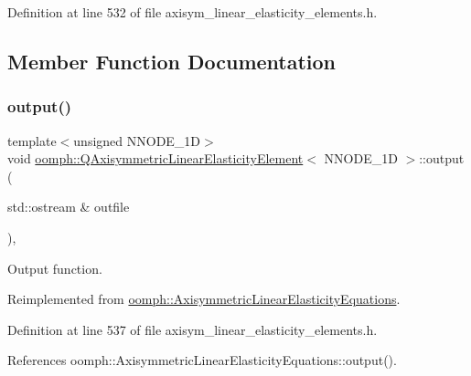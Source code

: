 Definition at line 532 of file axisym\+\_\+linear\+\_\+elasticity\+\_\+elements.\+h.



\subsection{Member Function Documentation}
\mbox{\label{classoomph_1_1QAxisymmetricLinearElasticityElement_adfd535d5ee563df242c0ff5febca99e2}} 
\subsubsection{\texorpdfstring{output()}{output()}\hspace{0.1cm}{\footnotesize\ttfamily [1/4]}}
{\footnotesize\ttfamily template$<$unsigned N\+N\+O\+D\+E\+\_\+1D$>$ \\
void \hyperlink{classoomph_1_1QAxisymmetricLinearElasticityElement}{oomph\+::\+Q\+Axisymmetric\+Linear\+Elasticity\+Element}$<$ N\+N\+O\+D\+E\+\_\+1D $>$\+::output (\begin{DoxyParamCaption}\item[{std\+::ostream \&}]{outfile }\end{DoxyParamCaption})\hspace{0.3cm}{\ttfamily [inline]}, {\ttfamily [virtual]}}



Output function. 



Reimplemented from \hyperlink{classoomph_1_1AxisymmetricLinearElasticityEquations_a798627057a8d79bccc17d277e1717f67}{oomph\+::\+Axisymmetric\+Linear\+Elasticity\+Equations}.



Definition at line 537 of file axisym\+\_\+linear\+\_\+elasticity\+\_\+elements.\+h.



References oomph\+::\+Axisymmetric\+Linear\+Elasticity\+Equations\+::output().

\mbox{\label{classoomph_1_1QAxisymmetricLinearElasticityElement_a3339817db6273a1285615d05d0e99a07}} 
